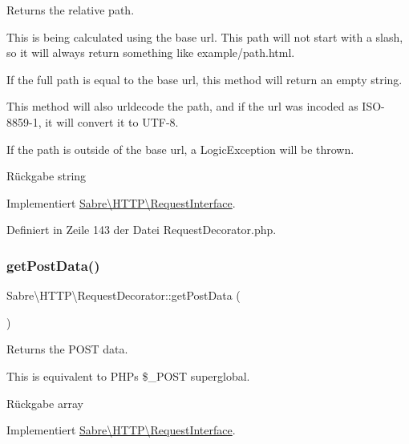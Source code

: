 Returns the relative path.

This is being calculated using the base url. This path will not start with a slash, so it will always return something like \textquotesingle{}example/path.\+html\textquotesingle{}.

If the full path is equal to the base url, this method will return an empty string.

This method will also urldecode the path, and if the url was incoded as I\+S\+O-\/8859-\/1, it will convert it to U\+T\+F-\/8.

If the path is outside of the base url, a Logic\+Exception will be thrown.

\begin{DoxyReturn}{Rückgabe}
string 
\end{DoxyReturn}


Implementiert \mbox{\hyperlink{interface_sabre_1_1_h_t_t_p_1_1_request_interface_aea4dd5571c841fa1e41b05813299bae4}{Sabre\textbackslash{}\+H\+T\+T\+P\textbackslash{}\+Request\+Interface}}.



Definiert in Zeile 143 der Datei Request\+Decorator.\+php.

\mbox{\label{class_sabre_1_1_h_t_t_p_1_1_request_decorator_ac11069037a0860cdcdf128ee9ba307fb}} 
\subsubsection{\texorpdfstring{get\+Post\+Data()}{getPostData()}}
{\footnotesize\ttfamily Sabre\textbackslash{}\+H\+T\+T\+P\textbackslash{}\+Request\+Decorator\+::get\+Post\+Data (\begin{DoxyParamCaption}{ }\end{DoxyParamCaption})}

Returns the P\+O\+ST data.

This is equivalent to P\+HP\textquotesingle{}s \$\+\_\+\+P\+O\+ST superglobal.

\begin{DoxyReturn}{Rückgabe}
array 
\end{DoxyReturn}


Implementiert \mbox{\hyperlink{interface_sabre_1_1_h_t_t_p_1_1_request_interface_ae33360454f0d43e566b76de24682af33}{Sabre\textbackslash{}\+H\+T\+T\+P\textbackslash{}\+Request\+Interface}}.



